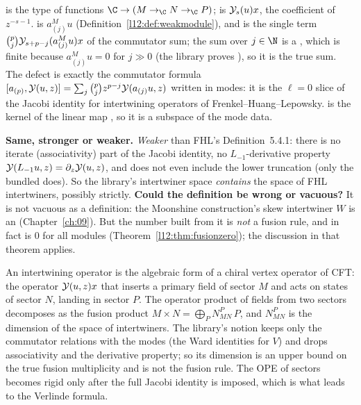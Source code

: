 \begin{dictionary}
 is the type of functions $\C\to(M\to_{\C}N\to_{\C}P)$;  is $\mathcal{Y}_s(u)x$, the
coefficient of $z^{-s-1}$.  is $a^M_{(j)}u$ (Definition~\ref{l12:def:weakmodule}), and
 is the single term $\binom pj\mathcal{Y}_{s+p-j}(a^M_{(j)}u)x$ of the commutator sum; the sum over $j\in\N$ is a
, which is finite because $a^M_{(j)}u = 0$ for $j\gg0$ (the library proves
), so it is the true sum. The defect is exactly the commutator formula
$[a_{(p)},\mathcal{Y}(u,z)] = \sum_j\binom pj z^{p-j}\mathcal{Y}(a_{(j)}u,z)$ written in modes: it is the $\ell=0$ slice of the Jacobi
identity for intertwining operators of Frenkel--Huang--Lepowsky.  is the kernel of the linear map
, so it is a subspace of the mode data.

\textbf{Same, stronger or weaker.} \emph{Weaker} than FHL's Definition~5.4.1: there is no iterate (associativity) part of the Jacobi
identity, no $L_{-1}$-derivative property $\mathcal{Y}(L_{-1}u,z) = \partial_z\mathcal{Y}(u,z)$, and  does not
even include the lower truncation (only the bundled  does). So the library's intertwiner space \emph{contains} the space
of FHL intertwiners, possibly strictly. \textbf{Could the definition be wrong or vacuous?} It is not vacuous as a definition: the Moonshine
construction's skew intertwiner $W$ is an  (Chapter~\ref{ch:09}). But the number  built from it is
\emph{not} a fusion rule, and in fact is $0$ for all modules (Theorem~\ref{l12:thm:fusionzero}); the discussion in that theorem applies.
\end{dictionary}

\begin{physics}
An intertwining operator is the algebraic form of a chiral vertex operator of CFT: the operator $\mathcal{Y}(u,z)x$ that inserts a primary field
of sector $M$ and acts on states of sector $N$, landing in sector $P$. The operator product of fields from two sectors
decomposes as the fusion product $M\times N = \bigoplus_PN_{MN}^P\,P$, and $N^P_{MN}$ is the dimension of the space of intertwiners. The library's notion
keeps only the commutator relations with the modes (the Ward identities for $V$) and drops associativity and the derivative property; so
its dimension is an upper bound on the true fusion multiplicity and is not the fusion rule. The OPE of sectors becomes rigid only
after the full Jacobi identity is imposed, which is what leads to the Verlinde formula.
\end{physics}

